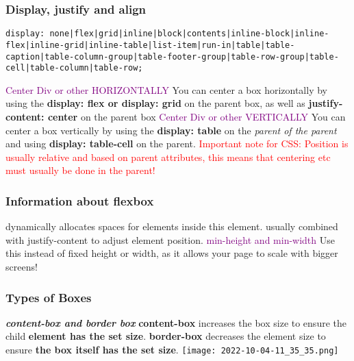 \documentclass[main.tex,fontsize=6pt,paper=a4,paper=landscape,DIV=calc,]{scrartcl}
\begin{document}
\begin{multicols*}{4}
\subsubsection{Display, justify and align}
\vspace{-2mm}
\begin{lstlisting}
display: none|flex|grid|inline|block|contents|inline-block|inline-flex|inline-grid|inline-table|list-item|run-in|table|table-caption|table-column-group|table-footer-group|table-row-group|table-cell|table-column|table-row;
\end{lstlisting}
\vspace{2mm}
\textcolor{purple}{Center Div or other HORIZONTALLY}\newline 
You can center a box horizontally by using the \textbf{display: flex or display: grid} on the parent box, as well as \textbf{justify-content: center} on the parent box\newline
\textcolor{purple}{Center Div or other VERTICALLY}\newline 
You can center a box vertically by using the \textbf{display: table} on the \emph{parent of the parent} and using \textbf{display: table-cell} on the parent.\newline 
\textcolor{red}{Important note for CSS: Position is usually relative and based on parent attributes, this means that centering etc must usually be done in the parent!}

\subsubsection{Information about flexbox}
dynamically allocates spaces for elements inside this element.
usually combined with justify-content to adjust element position.\newline 
\textcolor{purple}{min-height and min-width}\newline 
Use this instead of fixed height or width, as it allows your page to scale with bigger screens!


\subsubsection{Types of Boxes}
\textbf{\emph{content-box and border box}}
  \textbf{content-box} increases the box size to ensure the child \textbf{element has the set size}.\newline
  \textbf{border-box} decreases the element size to ensure \textbf{the box itself has the set size}.
\texttt{[image: 2022-10-04-11\_35\_35.png]}





\end{multicols*}
\end{document}
